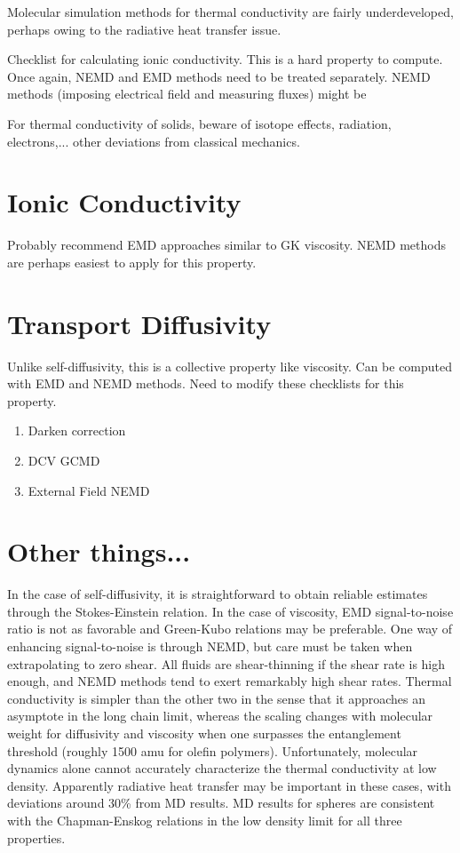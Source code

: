\documentclass[9pt]{livecoms}
\begin{document}
Molecular simulation methods for thermal conductivity are fairly underdeveloped, perhaps owing to the radiative heat transfer issue.

Checklist for calculating ionic conductivity. This is a hard property to compute. Once again, NEMD and EMD methods need to be treated separately. NEMD methods (imposing electrical field and measuring fluxes) might be 

For thermal conductivity of solids, beware of isotope effects, radiation, electrons,... other deviations from classical mechanics. 


\section{Ionic Conductivity}

Probably recommend EMD approaches similar to GK viscosity. NEMD methods are perhaps easiest to apply for this property.

\section{Transport Diffusivity}

Unlike self-diffusivity, this is a collective property like viscosity. Can be computed with EMD and NEMD methods. Need to modify these checklists for this property. 

\begin{enumerate}
	\item Darken correction
	\item DCV GCMD
	\item External Field NEMD
\end{enumerate}

\section{Other things...}

In the case of self-diffusivity, it is straightforward to obtain reliable estimates through the Stokes-Einstein relation. In the case of viscosity, EMD signal-to-noise ratio is not as favorable and Green-Kubo relations may be preferable. One way of enhancing signal-to-noise is through NEMD, but care must be taken when extrapolating to zero shear. All fluids are shear-thinning if the shear rate is high enough, and NEMD methods tend to exert remarkably high shear rates. Thermal conductivity is simpler than the other two in the sense that it approaches an asymptote in the long chain limit, whereas the scaling changes with molecular weight for diffusivity and viscosity when one surpasses the entanglement threshold (roughly 1500 amu for olefin polymers). Unfortunately, molecular dynamics alone cannot accurately characterize the thermal conductivity at low density. Apparently radiative heat transfer may be important in these cases, with deviations around 30\% from MD results. MD results for spheres are consistent with the Chapman-Enskog relations in the low density limit for all three properties.
\end{document}
